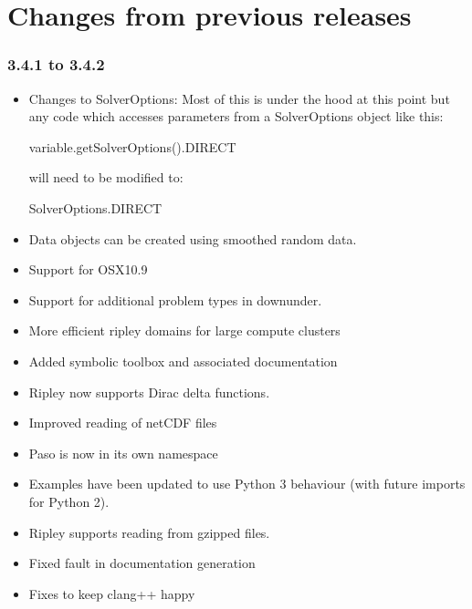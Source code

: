 
%
%
%

\chapter{Changes from previous releases}
\label{app:changes}

\subsection*{3.4.1 to 3.4.2}
\begin{itemize}
 \item Changes to SolverOptions: Most of this is under the hood at this point
  but any code which accesses parameters from a SolverOptions object like this:
 \begin{python}
   variable.getSolverOptions().DIRECT
 \end{python}
 will need to be modified to:
 \begin{python}
   SolverOptions.DIRECT
 \end{python}

 \item Data objects can be created using smoothed random data.
 \item Support for OSX10.9
 \item Support for additional problem types in downunder.
 \item More efficient ripley domains for large compute clusters
 \item Added symbolic toolbox and associated documentation
 \item Ripley now supports Dirac delta functions.
 \item Improved reading of netCDF files
 \item Paso is now in its own namespace
 \item Examples have been updated to use Python 3 behaviour (with future imports for Python 2).
 \item Ripley supports reading from gzipped files.
 \item Fixed fault in documentation generation
 \item Fixes to keep clang++ happy
\end{itemize}


